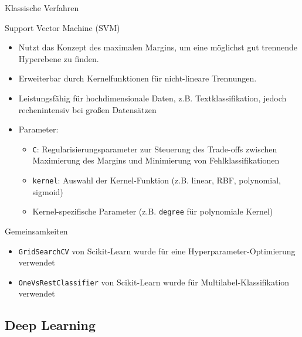 \documentclass[aspectratio=169]{beamer} %
\begin{document}
\begin{frame}{Klassische Verfahren}
    \begin{block}{Support Vector Machine (SVM)}
        \begin{itemize}
            \item Nutzt das Konzept des maximalen Margins, um eine möglichst gut trennende Hyperebene zu finden.
            \item Erweiterbar durch Kernelfunktionen für nicht-lineare Trennungen.
            \item Leistungsfähig für hochdimensionale Daten, z.B. Textklassifikation, jedoch rechenintensiv bei großen Datensätzen
            \item Parameter:
                  \begin{itemize}
                      \item \texttt{C}: Regularisierungsparameter zur Steuerung des Trade-offs zwischen Maximierung des Margins und Minimierung von Fehlklassifikationen
                      \item \texttt{kernel}: Auswahl der Kernel-Funktion (z.B. linear, RBF, polynomial, sigmoid)
                      \item Kernel-spezifische Parameter (z.B. \texttt{degree} für polynomiale Kernel)
                  \end{itemize}
        \end{itemize}
    \end{block}
\end{frame}


\begin{frame}
    \begin{block}{Gemeinsamkeiten} %
        \begin{itemize}
            \item \texttt{GridSearchCV} von Scikit-Learn wurde für eine Hyperparameter-Optimierung verwendet
            \item \texttt{OneVsRestClassifier} von Scikit-Learn wurde für Multilabel-Klassifikation verwendet
        \end{itemize}
    \end{block}
\end{frame}

\subsection{Deep Learning}
\end{document}
